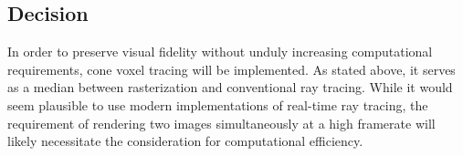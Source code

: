 \documentclass[onecolumn, draftclsnofoot,10pt, compsoc]{IEEEtran}
\begin{document}
\subsection{Decision}
In order to preserve visual fidelity without unduly increasing computational requirements, cone voxel tracing will be implemented. As stated above, it serves as a median between rasterization and conventional ray tracing. While it would seem plausible to use modern implementations of real-time ray tracing, the requirement of rendering two images simultaneously at a high framerate will likely necessitate the consideration for computational efficiency.
\end{document}
